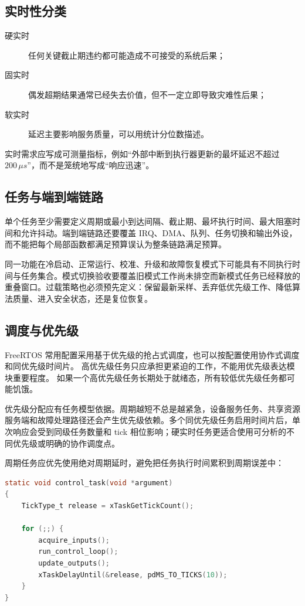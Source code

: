 \subsection{实时性分类}

\begin{description}
  \item[硬实时] 任何关键截止期违约都可能造成不可接受的系统后果；
  \item[固实时] 偶发超期结果通常已经失去价值，但不一定立即导致灾难性后果；
  \item[软实时] 延迟主要影响服务质量，可以用统计分位数描述。
\end{description}

实时需求应写成可测量指标，例如“外部中断到执行器更新的最坏延迟不超过 $200\,\mu s$”，而不是笼统地写成“响应迅速”。

\subsection{任务与端到端链路}

单个任务至少需要定义周期或最小到达间隔、截止期、最坏执行时间、最大阻塞时间和允许抖动。端到端链路还要覆盖 IRQ、DMA、队列、任务切换和输出外设，而不能把每个局部函数都满足预算误认为整条链路满足预算。

同一功能在冷启动、正常运行、校准、升级和故障恢复模式下可能具有不同执行时间与任务集合。模式切换验收要覆盖旧模式工作尚未排空而新模式任务已经释放的重叠窗口。过载策略也必须预先定义：保留最新采样、丢弃低优先级工作、降低算法质量、进入安全状态，还是复位恢复。

\subsection{调度与优先级}

FreeRTOS 常用配置采用基于优先级的抢占式调度，也可以按配置使用协作式调度和同优先级时间片\cite{freertos-kernel-book}。
高优先级任务只应承担更紧迫的工作，不能用优先级表达模块重要程度。
如果一个高优先级任务长期处于就绪态，所有较低优先级任务都可能饥饿。

优先级分配应有任务模型依据。周期越短不总是越紧急，设备服务任务、共享资源服务端和故障处理路径还会产生优先级依赖。多个同优先级任务启用时间片后，单次响应会受到同级任务数量和 tick 相位影响；硬实时任务更适合使用可分析的不同优先级或明确的协作调度点。

周期任务应优先使用绝对周期延时，避免把任务执行时间累积到周期误差中：

\begin{lstlisting}[language=C]
static void control_task(void *argument)
{
    TickType_t release = xTaskGetTickCount();

    for (;;) {
        acquire_inputs();
        run_control_loop();
        update_outputs();
        xTaskDelayUntil(&release, pdMS_TO_TICKS(10));
    }
}
\end{lstlisting}

